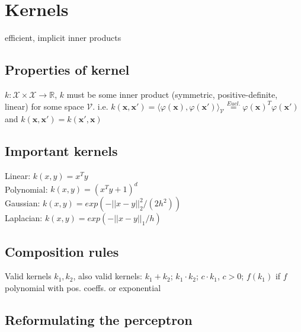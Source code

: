 \section*{Kernels}

efficient, implicit inner products

\subsection*{Properties of kernel}
$k: \mathcal{X} \times \mathcal{X} \rightarrow \mathbb{R}$, $k$ must be some inner product (symmetric, positive-definite, linear) for some space $\mathcal{V}$.
i.e. $k(\mathbf{x}, \mathbf{x'}) = \langle \varphi(\mathbf{x}), \varphi(\mathbf{x'}) \rangle_\mathcal{V} \overset{Eucl.}{=} \varphi(\mathbf{x})^T \varphi(\mathbf{x'}) $
and $k(\mathbf{x}, \mathbf{x}') = k(\mathbf{x}', \mathbf{x})$


\subsection*{Important kernels}
Linear: $k(x,y)=x^T y$\\
Polynomial: $k(x,y)=(x^T y + 1)^d$\\
Gaussian: $k(x,y) = exp(-||x-y||_2^2/(2h^2))$\\
Laplacian: $k(x,y) = exp(-||x-y||_1/h)$

\subsection*{Composition rules}
Valid kernels $k_1, k_2$, also valid kernels:
$k_1 + k_2$; $k_1 \cdot k_2$; $c \cdot k_1$, $c>0$;
$f(k_1)$ if $f$ polynomial with pos. coeffs. or exponential

\subsection*{Reformulating the perceptron}

